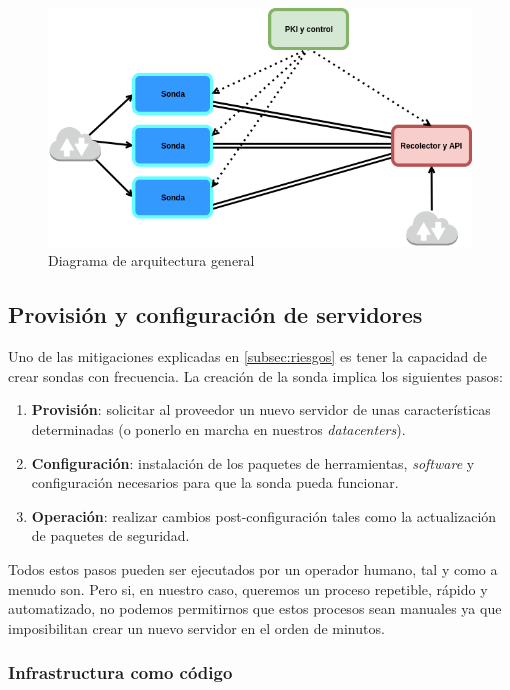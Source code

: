 \begin{figure}[h]
    \centering
      \includegraphics[scale=0.5]{images/arquitectura_general}
    \caption{Diagrama de arquitectura general}
    \label{fig:arquitectura-general}
  \end{figure}

\subsection{Provisión y configuración de servidores}
\label{subsec:server-config}

Uno de las mitigaciones explicadas en \ref{subsec:riesgos} es tener la capacidad de crear sondas con frecuencia. La creación de la sonda implica
los siguientes pasos:

\begin{enumerate}
    \item \textbf{Provisión}: solicitar al proveedor un nuevo servidor de unas características determinadas (o ponerlo en marcha en nuestros \emph{datacenters}).
    \item \textbf{Configuración}: instalación de los paquetes de herramientas, \emph{software} y configuración necesarios para que la sonda pueda funcionar.
    \item \textbf{Operación}: realizar cambios post-configuración tales como la actualización de paquetes de seguridad.
\end{enumerate}

Todos estos pasos pueden ser ejecutados por un operador humano, tal y como a menudo son. Pero si, en nuestro caso, queremos un proceso repetible, rápido y automatizado,
no podemos permitirnos que estos procesos sean manuales ya que imposibilitan crear un nuevo servidor en el orden de minutos.

\subsubsection{Infrastructura como código}
\label{subsec:infra-as-code}

